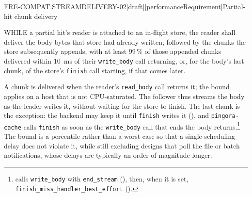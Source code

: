 \begin{requirement}{FRE-COMPAT.STREAMDELIVERY-02}[draft][performanceRequirement]{Partial-hit chunk delivery}


  WHILE a partial hit's reader is attached to an in-flight store, the reader
  shall deliver the body bytes that store had already written, followed by
  the chunks the store subsequently appends, with at least 99\,\% of those
  appended chunks delivered within 10~ms of their \texttt{write\_body} call
  returning, or, for the body's last chunk, of the store's \texttt{finish}
  call starting, if that comes later.

  A chunk is delivered when the reader's \texttt{read\_body} call returns it;
  the bound applies on a host that is not CPU-saturated. The follower thus
  streams the body as the leader writes it, without waiting for the store to
  finish. The last chunk is the exception: the backend may keep it until
  \texttt{finish} writes it (), and
  \texttt{pingora-cache} calls \texttt{finish} as soon as the
  \texttt{write\_body} call that ends the body
  returns.\footnote{
  calls \texttt{write\_body} with \texttt{end\_stream}
  (), then, when it is
  set, \texttt{finish\_miss\_handler\_best\_effort}
  ().} The bound is a
  percentile rather than a worst case so that a single scheduling delay does
  not violate it, while still excluding designs that poll the file or batch
  notifications, whose delays are typically an order of magnitude longer.



\end{requirement}

